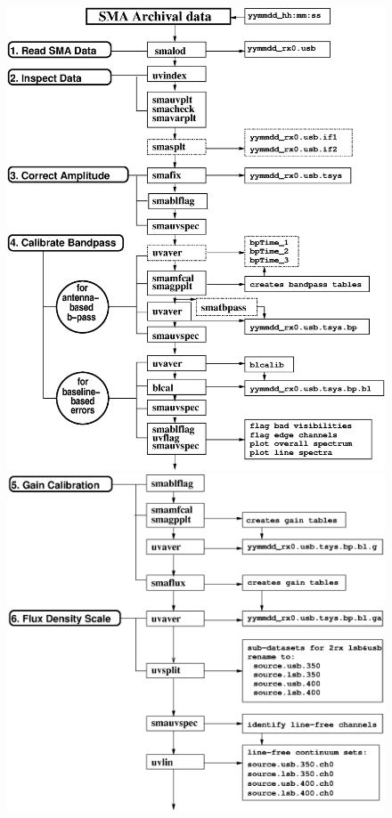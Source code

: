 \begin{figure}
\centering
\includegraphics[scale=0.5, angle = 0]{part7/Zhao_P36/f1a.eps}
\includegraphics[scale=0.5, angle = 0]{part7/Zhao_P36/f1b.eps}
\end{figure}
